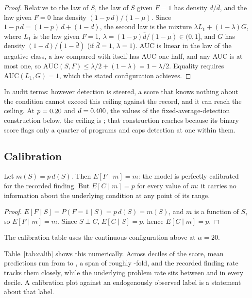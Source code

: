 \begin{proof}
Relative to the law of $S$, the law of $S$ given $F = 1$ has density $d/\bar
d$, and the law given $F = 0$ has density $(1 - p\,d)/(1 - \mu)$. Since $1 -
p\,d = (1-p)\,d + (1 - d)$, the second law is the mixture $\lambda L_1 +
(1-\lambda) G$, where $L_1$ is the law given $F = 1$, $\lambda = (1-p)\bar
d/(1-\mu) \in (0,1]$, and $G$ has density $(1-d)/(1-\bar d)$ (if $\bar d = 1$,
$\lambda = 1$). AUC is linear in the law of the negative class, a law compared
with itself has AUC one-half, and any AUC is at most one, so $\mathrm{AUC}(S,F)
\le \lambda/2 + (1 - \lambda) = 1 - \lambda/2$. Equality requires
$\mathrm{AUC}(L_1, G) = 1$, which the stated configuration achieves.
\end{proof}

In audit terms: however detection is steered, a score that knows nothing about
the condition cannot exceed this ceiling against the record, and it can reach
the ceiling. At $p = 0.20{}$ and $\bar d = 0.400{}$, the values
of the fixed-average-detection construction below, the ceiling is
\nAucEnvelope{}; that construction reaches \nBudgetAucFend{} because its binary
score flags only a quarter of programs and caps detection at one within
them.

\subsection{Calibration}

\begin{proposition}\label{prop:calib}
Let $m(S) = p\,d(S)$. Then $E[F \mid m] = m$: the model is perfectly calibrated
for the recorded finding. But $E[C \mid m] = p$ for every value of $m$: it
carries no information about the underlying condition at any point of its
range.
\end{proposition}

\begin{proof}
$E[F \mid S] = P(F=1 \mid S) = p\,d(S) = m(S)$, and $m$ is a function of $S$, so
$E[F \mid m] = m$. Since $S \perp C$, $E[C \mid S] = p$, hence $E[C \mid m] = p$.
\end{proof}

The calibration table uses the continuous configuration above at $\alpha =
20$.

Table~\ref{tab:calib} shows this numerically. Across deciles of the score, mean
predictions run from \nCalibLo{} to \nCalibHi{}, a span of roughly
\nCalibSpan{}-fold, and the recorded finding rate tracks them closely, while
the underlying problem rate sits between \nCalibLatentLo{} and
\nCalibLatentHi{} in every decile. A calibration plot against an endogenously
observed label is a statement about that label.

